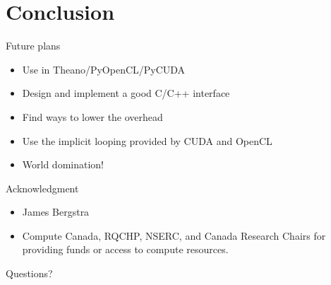 \documentclass[utf8x,xcolor=pdftex,dvipsnames,table]{beamer}
\begin{document}
\section{Conclusion}
\begin{frame}{Future plans}
\begin{itemize}
\item<1-> Use in Theano/PyOpenCL/PyCUDA
\item<2-> Design and implement a good C/C++ interface
\item<3-> Find ways to lower the overhead
\item<4-> Use the implicit looping provided by CUDA and OpenCL
\item<5-> World domination!
\end{itemize}
\end{frame}

\begin{frame}{Acknowledgment}
\begin{itemize}
\item James Bergstra
\item Compute Canada, RQCHP, NSERC, and Canada Research Chairs for providing funds or access to compute resources.
\end{itemize}
\end{frame}

\begin{frame}
\begin{center}
\Huge
Questions?
\end{center}
\end{frame}
\end{document}
